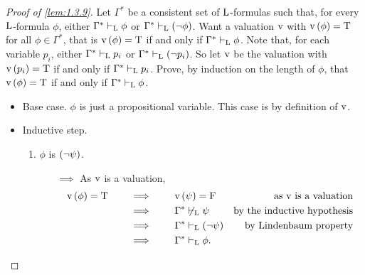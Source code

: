 \begin{proof}[Proof of \ref{lem:1.3.9}]
Let $ \Gamma^* $ be a consistent set of $ \mathrm{L} $-formulas such that, for every $ \mathrm{L} $-formula $ \phi $, either $ \Gamma^* \vdash_{\mathrm{L}} \phi $ or $ \Gamma^* \vdash_\L \notb{\phi} $. Want a valuation $ \mathrm{v} $ with $ \v\br{\phi} = \T $ for all $ \phi \in \Gamma^* $, that is $ \v\br{\phi} = \T $ if and only if $ \Gamma^* \vdash_{\mathrm{L}} \phi $. Note that, for each variable $ p_i $, either $ \Gamma^* \vdash_{\mathrm{L}} p_i $ or $ \Gamma^* \vdash_\L \notb{p_i} $. So let $ \mathrm{v} $ be the valuation with $ \v\br{p_i} = \T $ if and only if $ \Gamma^* \vdash_{\mathrm{L}} p_i $. Prove, by induction on the length of $ \phi $, that $ \v\br{\phi} = \T $ if and only if $ \Gamma^* \vdash_{\mathrm{L}} \phi $.
\begin{itemize}
\item Base case. $ \phi $ is just a propositional variable. This case is by definition of $ \mathrm{v} $.
\item Inductive step.
\begin{enumerate}[leftmargin=0.5in, label=Case \arabic*.]
\item $ \phi $ is $ \notb{\psi} $.
\begin{itemize}
\item[$ \implies $] As $ \mathrm{v} $ is a valuation,
\begin{align*}
\v\br{\phi} = \T \qquad
& \implies \qquad \v\br{\psi} = \F & \text{as} \ \v \ \text{is a valuation} \\
& \implies \qquad \Gamma^* \not\vdash_\L \psi & \text{by the inductive hypothesis} \\
& \implies \qquad \Gamma^* \vdash_\L \notb{\psi} & \text{by Lindenbaum property} \\
& \implies \qquad \Gamma^* \vdash_\L \phi.
\end{align*}

\pagebreak


\end{itemize}
\end{enumerate}
\end{itemize}
\end{proof}
